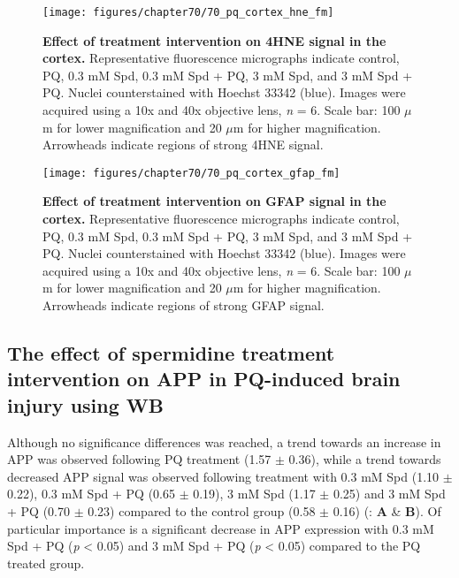 \begin{landscape}
\begin{figure}[!htbp]
\center
  \texttt{[image: figures/chapter70/70\_pq\_cortex\_hne\_fm]}
  \caption[Effect of treatment intervention on 4HNE signal in the cortex]{\textbf{Effect of treatment intervention on 4HNE signal in the cortex.} Representative fluorescence micrographs indicate control, PQ, 0.3 mM Spd, 0.3 mM Spd + PQ, 3 mM Spd, and 3 mM Spd + PQ. Nuclei counterstained with Hoechst 33342 (blue). Images were acquired using a 10x and 40x objective lens, \textit{n} = 6. Scale bar: 100 $\mu$m for lower magnification and 20 $\mu$m for higher magnification. Arrowheads indicate regions of strong 4HNE signal.}
  \label{fig:70_pq_cortex_hne_fm}
\end{figure} 
\end{landscape}

\begin{landscape}
\begin{figure}[!htbp]
\center
  \texttt{[image: figures/chapter70/70\_pq\_cortex\_gfap\_fm]}
  \caption[Effect of treatment intervention on GFAP signal in the cortex]{\textbf{Effect of treatment intervention on GFAP signal in the cortex.} Representative fluorescence micrographs indicate control, PQ, 0.3 mM Spd, 0.3 mM Spd + PQ, 3 mM Spd, and 3 mM Spd + PQ. Nuclei counterstained with Hoechst 33342 (blue). Images were acquired using a 10x and 40x objective lens, \textit{n} = 6. Scale bar: 100 $\mu$m for lower magnification and 20 $\mu$m for higher magnification. Arrowheads indicate regions of strong GFAP signal.}
  \label{fig:70_pq_cortex_gfap_fm}
\end{figure} 
\end{landscape}

\subsection{The effect of spermidine treatment intervention on APP in PQ-induced brain injury using WB}
Although no significance differences was reached, a trend towards an increase in APP was observed following PQ treatment (1.57 $\pm$ 0.36), while a trend towards decreased APP signal was observed following treatment with 0.3 mM Spd (1.10 $\pm$ 0.22), 0.3 mM Spd + PQ (0.65 $\pm$ 0.19), 3 mM Spd (1.17 $\pm$ 0.25) and 3 mM Spd + PQ (0.70 $\pm$ 0.23) compared to the control group (0.58 $\pm$ 0.16)  (: \textbf{A} \& \textbf{B}). Of particular importance is a significant decrease in APP expression with 0.3 mM Spd + PQ (\textit{p} < 0.05) and 3 mM Spd + PQ (\textit{p} < 0.05) compared to the PQ treated group. 

